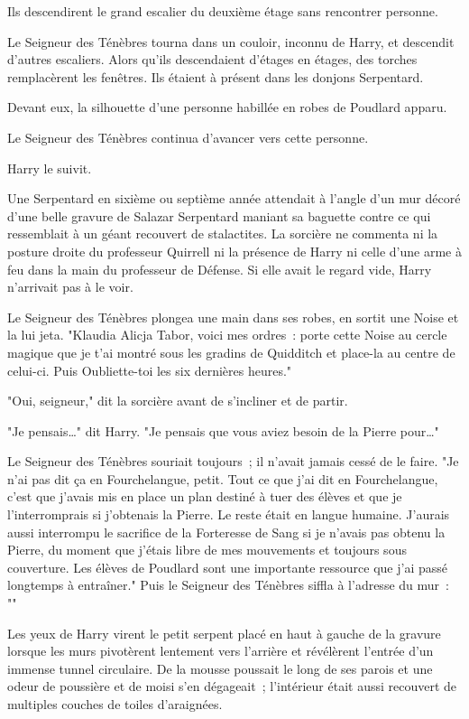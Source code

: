 Ils descendirent le grand escalier du deuxième étage sans rencontrer personne.

Le Seigneur des Ténèbres tourna dans un couloir, inconnu de Harry, et descendit d'autres escaliers. Alors qu'ils descendaient d'étages en étages, des torches remplacèrent les fenêtres. Ils étaient à présent dans les donjons Serpentard.

Devant eux, la silhouette d'une personne habillée en robes de Poudlard apparu.

Le Seigneur des Ténèbres continua d'avancer vers cette personne.

Harry le suivit.

Une Serpentard en sixième ou septième année attendait à l'angle d'un mur décoré d'une belle gravure de Salazar Serpentard maniant sa baguette contre ce qui ressemblait à un géant recouvert de stalactites. La sorcière ne commenta ni la posture droite du professeur Quirrell ni la présence de Harry ni celle d'une arme à feu dans la main du professeur de Défense. Si elle avait le regard vide, Harry n'arrivait pas à le voir.

Le Seigneur des Ténèbres plongea une main dans ses robes, en sortit une Noise et la lui jeta. "Klaudia Alicja Tabor, voici mes ordres~: porte cette Noise au cercle magique que je t'ai montré sous les gradins de Quidditch et place-la au centre de celui-ci. Puis Oubliette-toi les six dernières heures."

"Oui, seigneur," dit la sorcière avant de s'incliner et de partir.

"Je pensais…" dit Harry. "Je pensais que vous aviez besoin de la Pierre pour…"

Le Seigneur des Ténèbres souriait toujours~; il n'avait jamais cessé de le faire. "Je n'ai pas dit ça en Fourchelangue, petit. Tout ce que j'ai dit en Fourchelangue, c'est que j'avais mis en place un plan destiné à tuer des élèves et que je l'interromprais si j'obtenais la Pierre. Le reste était en langue humaine. J'aurais aussi interrompu le sacrifice de la Forteresse de Sang si je n'avais pas obtenu la Pierre, du moment que j'étais libre de mes mouvements et toujours sous couverture. Les élèves de Poudlard sont une importante ressource que j'ai passé longtemps à entraîner." Puis le Seigneur des Ténèbres siffla à l'adresse du mur~: ""

Les yeux de Harry virent le petit serpent placé en haut à gauche de la gravure lorsque les murs pivotèrent lentement vers l'arrière et révélèrent l'entrée d'un immense tunnel circulaire. De la mousse poussait le long de ses parois et une odeur de poussière et de moisi s'en dégageait~; l'intérieur était aussi recouvert de multiples couches de toiles d'araignées.

